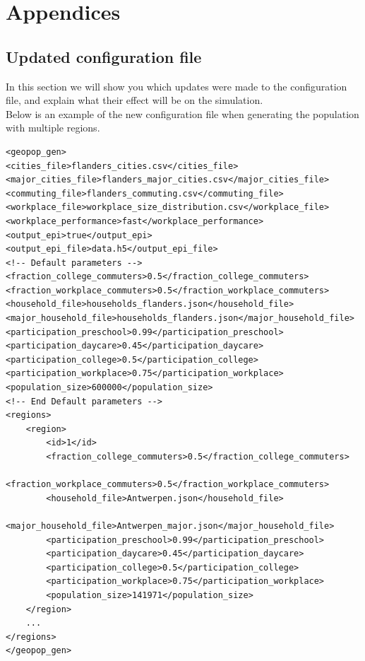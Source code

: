 \chapter{Appendices}
\label{chap:appendices}

\section{Updated configuration file}
\label{section:updated_config_file}

In this section we will show you which updates were made to the configuration file, and explain what their effect will be on the simulation.\\
Below is an example of the new configuration file when generating the population with multiple regions.

\begin{lstlisting}[caption={$<$geopop\_gen$>$ configuration},captionpos=b]
<geopop_gen>
<cities_file>flanders_cities.csv</cities_file>
<major_cities_file>flanders_major_cities.csv</major_cities_file>
<commuting_file>flanders_commuting.csv</commuting_file>
<workplace_file>workplace_size_distribution.csv</workplace_file>
<workplace_performance>fast</workplace_performance>
<output_epi>true</output_epi>
<output_epi_file>data.h5</output_epi_file>
<!-- Default parameters -->
<fraction_college_commuters>0.5</fraction_college_commuters>
<fraction_workplace_commuters>0.5</fraction_workplace_commuters>
<household_file>households_flanders.json</household_file>
<major_household_file>households_flanders.json</major_household_file>
<participation_preschool>0.99</participation_preschool>
<participation_daycare>0.45</participation_daycare>
<participation_college>0.5</participation_college>
<participation_workplace>0.75</participation_workplace>
<population_size>600000</population_size>
<!-- End Default parameters -->
<regions>
	<region>
		<id>1</id>
		<fraction_college_commuters>0.5</fraction_college_commuters>
		<fraction_workplace_commuters>0.5</fraction_workplace_commuters>
		<household_file>Antwerpen.json</household_file>
		<major_household_file>Antwerpen_major.json</major_household_file>
		<participation_preschool>0.99</participation_preschool>
		<participation_daycare>0.45</participation_daycare>
		<participation_college>0.5</participation_college>
		<participation_workplace>0.75</participation_workplace>
		<population_size>141971</population_size>
	</region>
	...
</regions>
</geopop_gen>
\end{lstlisting}

